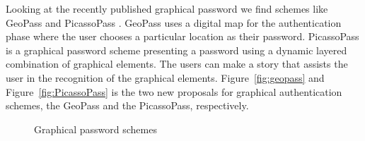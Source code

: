   Looking at the recently published graphical password we find schemes like GeoPass \cite{GeoPass} and PicassoPass \cite{PicassoPass}. GeoPass uses a digital map for the authentication phase where the user chooses a particular location as their password. PicassoPass is a graphical password scheme presenting a password using a dynamic layered combination of graphical elements. The users can make a story that assists the user in the recognition of the graphical elements. Figure~\ref{fig:geopass} and Figure~\ref{fig:PicassoPass} is the two new proposals for graphical authentication schemes, the GeoPass and the PicassoPass, respectively. 

    \begin{figure}[H]
      \centering
      \caption{Graphical password schemes}
    \end{figure}
  